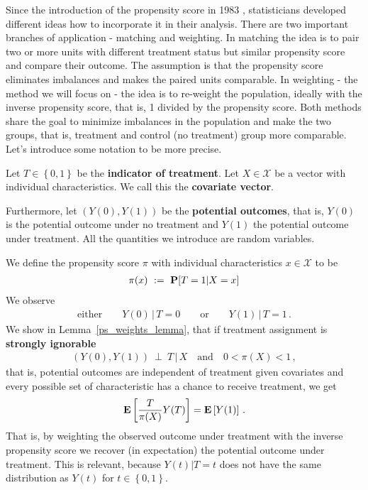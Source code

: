 Since the introduction of the propensity score in 1983 \cite{Rosenbaum1983}, statisticians developed different ideas how to incorporate it in their analysis. 
%
There are two important branches of application - matching and weighting.
In matching the idea is to pair two or more units with different treatment status but similar propensity score and compare their outcome. 
The assumption is that the propensity score eliminates imbalances and makes the paired units comparable.
In weighting - the method we will focus on - the idea is to re-weight the population, ideally with the inverse propensity score, that is, 1 divided by the propensity score.
Both methods share the goal to minimize imbalances in the population
and make the two groups, that is, treatment and control (no treatment) group more comparable.
Let's introduce some notation to be more precise.

Let $T\in \left\{ 0,1 \right\}$ be the \textbf{indicator of treatment}. 
Let $X\in\mathcal{X}$ be a vector with individual characteristics. We call this the \textbf{covariate vector}. 

Furthermore, let $(Y(0),Y(1))$ be the \textbf{potential outcomes}, that is, $Y(0)$ is the potential outcome under no treatment and $Y(1)$ the potential outcome under treatment.
All the quantities we introduce are random variables.

We define the propensity score $\pi$ with individual characteristics $x\in\mathcal{X}$ to be
\begin{gather}
  \label{def:ps} 
\pi(x)
\ 
:=
\ 
\P[T=1|X=x]
\end{gather}
We observe  
\begin{gather*}
  \text{either}
  \qquad
  Y(0)\,|\,T=0
  \qquad
  \text{or}\qquad
  Y(1)\,|\,T=1
  \,.
\end{gather*}
We show in Lemma~\ref{ps_weights_lemma}, that if treatment assignment is \textbf{strongly ignorable}\cite[(1.3)]{Rosenbaum1983}
\begin{gather}
  \label{asu:treatment_asign_str_ing}
  (Y(0),Y(1))\ \perp \ T \,|\,X
  \quad
  \text{and}
  \quad
  0<\pi(X)<1
  \,,
\end{gather}
that is, 
potential outcomes are independent of treatment given covariates and every possible set of characteristic has a chance to receive treatment,
we get 
\begin{gather}
  \label{ipw}
  \mathbf{E}
  \left[ 
    \frac{T}{\pi(X)}Y(T)
  \right]
  =
  \mathbf{E}
  \left[ Y(1) \right]
  \,.
\end{gather}
That is, by weighting the observed outcome under treatment with the inverse propensity score we recover (in expectation) the potential outcome under treatment. 
This is relevant, because 
$Y(t)|T=t$ does not have the same distribution as $Y(t)$ for $t\in \left\{ 0,1 \right\}$.

